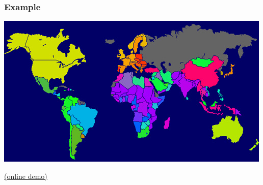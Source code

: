\documentclass{beamer}
\begin{document}

\begin{frame}
  \frametitle{Example}

  \centering
  \includegraphics[width=\linewidth]{worldpovertymap}

  \raggedleft
  \tiny
  \href{https://irath96.github.io/som-demo/}{(online demo)}
\end{frame}




\end{document}

